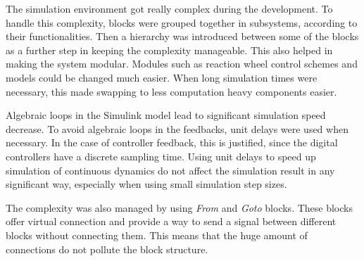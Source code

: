 
The simulation environment got really complex during the development. To handle this complexity, blocks were grouped together in subsystems, according to their functionalities. Then a hierarchy was introduced between some of the blocks as a further step in keeping the complexity manageable. This also helped in making the system modular. Modules such as reaction wheel control schemes and models could be changed much easier. When long simulation times were necessary, this made swapping to less computation heavy components easier.


Algebraic loops in the Simulink model lead to significant simulation speed decrease. To avoid algebraic loops in the feedbacks, unit delays were used when necessary. In the case of controller feedback, this is justified, since the digital controllers have a discrete sampling time. Using unit delays to speed up simulation of continuous dynamics do not affect the simulation result in any significant way, especially when using small simulation step sizes.



The complexity was also managed by using \textit{From} and \textit{Goto} blocks. These blocks offer virtual connection and provide a way to send a signal between different blocks without connecting them. This means that the huge amount of connections do not pollute the block structure.

